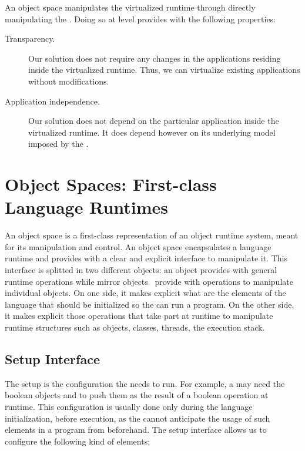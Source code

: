 An object space manipulates the virtualized runtime through directly manipulating the \VM. Doing so at \VM level provides \Vtt with the following properties:

\begin{description}
\item[Transparency.] Our solution does not require any changes in the applications residing inside the virtualized runtime. Thus, we can virtualize existing applications without modifications.
\item[Application independence.] Our solution does not depend on the particular application inside the virtualized runtime. It does depend however on its underlying model imposed by the \VM.
\end{description}

\section{Object Spaces: First-class Language Runtimes} \label{sec:object_space}

An object space is a first-class representation of an object runtime system, meant for its manipulation and control. An object space encapsulates a language runtime and provides with a clear and explicit interface to manipulate it. This interface is splitted in two different objects: an  object provides with general runtime operations while mirror objects~\cite{Brac04b} provide with operations to manipulate individual objects. On one side, it makes explicit what are the elements of the language that should be initialized so the \VM can run a program. On the other side, it makes explicit those operations that take part at runtime to manipulate runtime structures such as objects, classes, threads, the execution stack.

\subsection{\VM Setup Interface}

The \VM setup is the configuration the \VM needs to run.
For example, a \VM may need the boolean objects  and  to push them as the result of a boolean operation at runtime.
This configuration is usually done only during the language initialization, before execution, as the \VM cannot anticipate the usage of such elements in a program from beforehand.
The \VM setup interface allows us to configure the following kind of elements:

